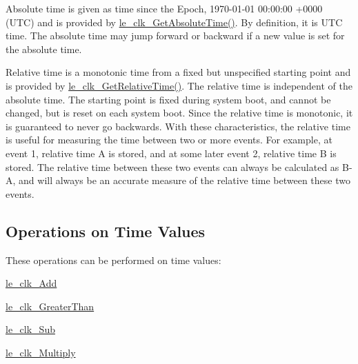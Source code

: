 Absolute time is given as time since the Epoch, 1970-\/01-\/01 00\+:00\+:00 +0000 (U\+T\+C) and is provided by \hyperlink{le__clock_8h_a33197dbd676a37b8c4d5de8f93edc1ee}{le\+\_\+clk\+\_\+\+Get\+Absolute\+Time()}. By definition, it is U\+T\+C time. The absolute time may jump forward or backward if a new value is set for the absolute time.

Relative time is a monotonic time from a fixed but unspecified starting point and is provided by \hyperlink{le__clock_8h_a298619d8c1d8f107cb03b8600f09a42b}{le\+\_\+clk\+\_\+\+Get\+Relative\+Time()}. The relative time is independent of the absolute time. The starting point is fixed during system boot, and cannot be changed, but is reset on each system boot. Since the relative time is monotonic, it is guaranteed to never go backwards. With these characteristics, the relative time is useful for measuring the time between two or more events. For example, at event 1, relative time A is stored, and at some later event 2, relative time B is stored. The relative time between these two events can always be calculated as B-\/\+A, and will always be an accurate measure of the relative time between these two events.\hypertarget{c_clock_clk_values}{}\subsection{Operations on Time Values}\label{c_clock_clk_values}
These operations can be performed on time values\+:
\begin{DoxyItemize}
\item \hyperlink{le__clock_8h_a6f4bda0268cd9349b6eb81ae350575fc}{le\+\_\+clk\+\_\+\+Add}
\item \hyperlink{le__clock_8h_ac4a550ee8aa5fad9c81a33024946660a}{le\+\_\+clk\+\_\+\+Greater\+Than}
\item \hyperlink{le__clock_8h_ac5b5ec6f462d598f4e5aa081224725ac}{le\+\_\+clk\+\_\+\+Sub}
\item \hyperlink{le__clock_8h_a77961175ee422b1418a18eece5192c9c}{le\+\_\+clk\+\_\+\+Multiply}
\end{DoxyItemize}

